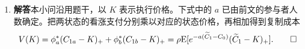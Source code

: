 \begin{solution}[blank-type=manual,blank-vsep=12\baselineskip]
\begin{enumerate}[label=(\alph*)]
 给定增长率分布改变 $C_0$ 时，利率方向由
 \[
 \frac{\partial r_F^*}{\partial C_0}
 =\frac{\rho a}{(B^*)^2}\mathrm E[\tilde g e^{-aC_0\tilde g}]
 \]

 决定。若两个状态的净增长率 $g_a,g_b$ 都为正，利率随 $C_0$ 上升；若都为负，利率下降；若一正一负，方向取决于上式的加权结果。与此同时，$\Delta=C_0(g_a-g_b)$ 随消费规模增大，绝对风险溢价也增加。若保持未来消费水平不变而提高 $C_0$，则债券价格上升、利率下降，绝对风险溢价不变。

 \item \textbf{解答}\quad 本小问沿用题干，以 $K$ 表示执行价格。下式中的 $a$ 已由前文的参与者人数确定。把两状态的看涨支付分别乘以对应的状态价格，再相加得到复制成本
 \[
 V(K)=\phi_a^*(C_{1a}-K)_++\phi_b^*(C_{1b}-K)_+
 =\rho\mathrm E[e^{-a(\widetilde C_1-C_0)}(\widetilde C_1-K)_+].\qedhere
 \]

\end{enumerate}
\end{solution}

